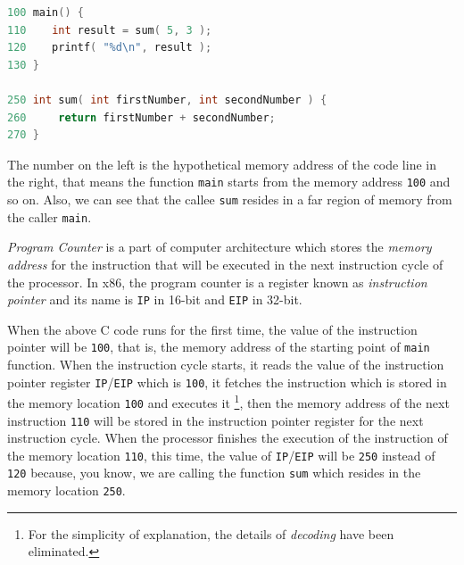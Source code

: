 \begin{lstlisting}[language=C]
100 main() {
110    int result = sum( 5, 3 );
120    printf( "%d\n", result );
130 }

250 int sum( int firstNumber, int secondNumber ) {
260     return firstNumber + secondNumber;
270 }
\end{lstlisting}

The number on the left is the hypothetical memory address of the code
line in the right, that means the function \lstinline!main! starts from
the memory address \lstinline!100! and so on. Also, we can see that the
callee \lstinline!sum! resides in a far region of memory from the caller
\lstinline!main!.

\emph{Program Counter} is a part of computer architecture which stores
the \emph{memory address} for the instruction that will be executed in
the next instruction cycle of the processor. In x86, the program counter
is a register known as \emph{instruction pointer} and its name is
\lstinline!IP! in 16-bit and \lstinline!EIP! in 32-bit.

When the above C code runs for the first time, the value of the
instruction pointer will be \lstinline!100!, that is, the memory address
of the starting point of \lstinline!main! function. When the instruction
cycle starts, it reads the value of the instruction pointer register
\lstinline!IP!/\lstinline!EIP! which is \lstinline!100!, it fetches the
instruction which is stored in the memory location \lstinline!100! and
executes it \footnote{For the simplicity of explanation, the details of
  \emph{decoding} have been eliminated.}, then the memory address of the
next instruction \lstinline!110! will be stored in the instruction
pointer register for the next instruction cycle. When the processor
finishes the execution of the instruction of the memory location
\lstinline!110!, this time, the value of \lstinline!IP!/\lstinline!EIP!
will be \lstinline!250! instead of \lstinline!120! because, you know, we
are calling the function \lstinline!sum! which resides in the memory
location \lstinline!250!.

